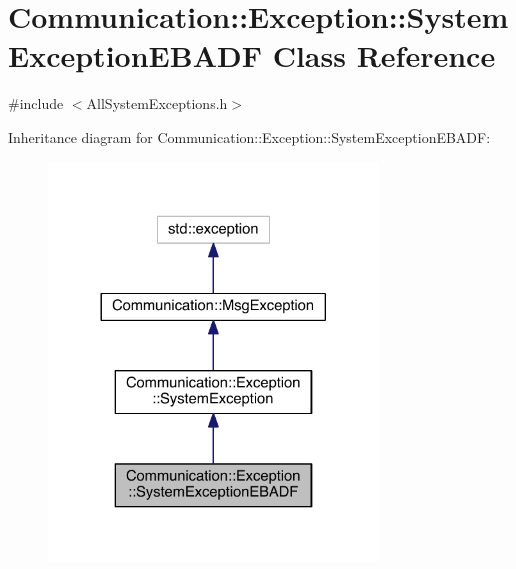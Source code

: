 \hypertarget{class_communication_1_1_exception_1_1_system_exception_e_b_a_d_f}{}\section{Communication\+:\+:Exception\+:\+:System\+Exception\+E\+B\+A\+D\+F Class Reference}
\label{class_communication_1_1_exception_1_1_system_exception_e_b_a_d_f}


{\ttfamily \#include $<$All\+System\+Exceptions.\+h$>$}



Inheritance diagram for Communication\+:\+:Exception\+:\+:System\+Exception\+E\+B\+A\+D\+F\+:\nopagebreak
\begin{figure}[H]
\begin{center}
\leavevmode
\includegraphics[width=248pt]{class_communication_1_1_exception_1_1_system_exception_e_b_a_d_f__inherit__graph}
\end{center}
\end{figure}



